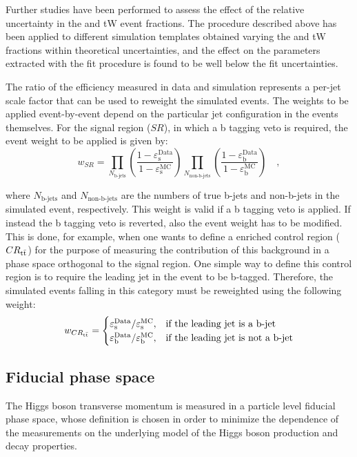 Further studies have been performed to assess the effect of the relative uncertainty in the \ttbar and tW event fractions. The procedure described above has been applied to different simulation templates obtained varying the \ttbar and tW fractions within theoretical uncertainties, and the effect on the parameters extracted with the fit procedure is found to be well below the fit uncertainties.

The ratio of the efficiency measured in data and simulation represents a per-jet scale factor that can be used to reweight the simulated events. The weights to be applied event-by-event depend on the particular jet configuration in the events themselves. For the signal region ($SR$), in which a b tagging veto is required, the event weight to be applied is given by:
\begin{equation}
w_{SR} = \prod_{N_\text{b-jets}} \left( \frac{1-\varepsilon_\mathrm{s}^\mathrm{Data}}{1-\varepsilon_\mathrm{s}^\mathrm{MC}} \right) \prod_{N_\text{non-b-jets}} \left( \frac{1-\varepsilon_\mathrm{b}^\mathrm{Data}}{1-\varepsilon_\mathrm{b}^\mathrm{MC}} \right) \quad ,
\end{equation}

\noindent where $N_\text{b-jets}$ and $N_\text{non-b-jets}$ are the numbers of true b-jets and non-b-jets in the simulated event, respectively. This weight is valid if a b tagging veto is applied. If instead the b tagging veto is reverted, also the event weight has to be modified. This is done, for example, when one wants to define a \ttbar enriched control region ($CR_{\mathrm{t}\bar{\mathrm{t}}}$) for the purpose of measuring the contribution of this background in a phase space orthogonal to the signal region. One simple way to define this control region is to require the leading jet in the event to be b-tagged. Therefore, the simulated events falling in this category must be reweighted using the following weight:
\begin{equation}
w_{CR_{\mathrm{t}\bar{\mathrm{t}}}} = 
\begin{cases}
\varepsilon_\mathrm{s}^\mathrm{Data}/\varepsilon_\mathrm{s}^\mathrm{MC},& \text{if the leading jet is a b-jet} \\
\varepsilon_\mathrm{b}^\mathrm{Data}/\varepsilon_\mathrm{b}^\mathrm{MC},& \text{if the leading jet is not a b-jet} 
\end{cases}
\end{equation}




\subsection{Fiducial phase space}\label{sec:fid_space}
The Higgs boson transverse momentum is measured in a particle level fiducial phase space, whose definition is chosen in order to minimize the dependence of the measurements on the underlying model of the Higgs boson production and decay properties.

